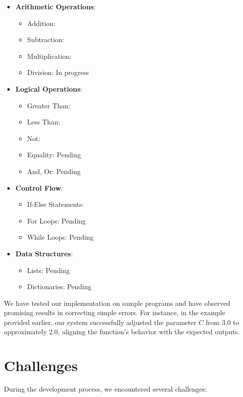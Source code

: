 \documentclass{article}
\begin{document}
\begin{itemize}
    \item \textbf{Arithmetic Operations}:
    \begin{itemize}
        \item Addition: \checkmark
        \item Subtraction: \checkmark
        \item Multiplication: \checkmark
        \item Division: In progress
    \end{itemize}
    \item \textbf{Logical Operations}:
    \begin{itemize}
        \item Greater Than: \checkmark
        \item Less Than: \checkmark
        \item Not: \checkmark
        \item Equality: Pending
        \item And, Or: Pending
    \end{itemize}
    \item \textbf{Control Flow}:
    \begin{itemize}
        \item If-Else Statements: \checkmark
        \item For Loops: Pending
        \item While Loops: Pending
    \end{itemize}
    \item \textbf{Data Structures}:
    \begin{itemize}
        \item Lists: Pending
        \item Dictionaries: Pending
    \end{itemize}
\end{itemize}

We have tested our implementation on sample programs and have observed promising results in correcting simple errors. For instance, in the example provided earlier, our system successfully adjusted the parameter $C$ from 3.0 to approximately 2.0, aligning the function's behavior with the expected outputs.

\section{Challenges}

During the development process, we encountered several challenges:
\end{document}
